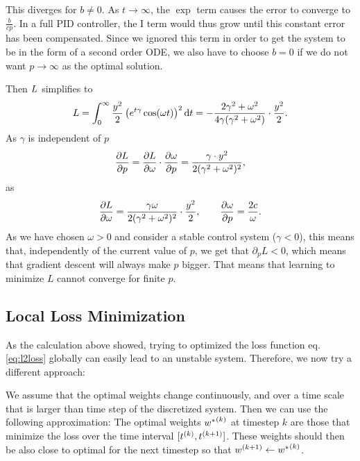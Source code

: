 \documentclass{article}
\begin{document}
    This diverges for $b \neq 0$. As $t \rightarrow \infty$, the $\exp$ term causes the error to converge to $\frac{b}{c p}$. 
    In a full PID controller, the I term would thus grow until this constant error has been compensated. 
    Since we ignored this term in order to get the system to be in the form of a second order ODE, 
    we also have to choose $b=0$ if we do not want $p \rightarrow \infty$ as the optimal solution.

    Then $L$ simplifies to
    \begin{align}
        L = \int_0^{\infty} \frac{y^2}{2}\left(e^{t\gamma} \cos (\omega t ) \right)^2 \mathrm{d}t = -\frac{2 \gamma^2 + \omega^2}{4 \gamma (\gamma^2 + \omega^2)} \cdot \frac{y^2}{2}.
    \end{align}
   As $\gamma$ is independent of $p$
    \begin{align}
        \frac{\partial L}{\partial p} = \frac{\partial L}{\partial \omega} \cdot \frac{\partial \omega}{\partial p} = \frac{\gamma \cdot y^2}{2 (\gamma^2 + \omega^2)^2},
    \end{align}
    as 
    \begin{align}
         \frac{\partial L}{\partial \omega} = \frac{\gamma \omega}{2 (\gamma^2 + \omega^2)^2} \cdot \frac{y^2}{2}, \qquad
         \frac{\partial \omega}{\partial p} = \frac{2 c}{\omega}.
    \end{align}
    As we have chosen $\omega >0$ and consider a stable control system ($\gamma < 0$), this means that, 
    independently of the current value of $p$, we get that $\partial_p L < 0$, 
    which means that gradient descent will always make $p$ bigger. 
    That means that learning to minimize $L$ cannot converge for finite $p$.

  \subsection{Local Loss Minimization}
    As the calculation above showed, trying to optimized the loss function eq. \eqref{eq:l2loss} globally can easily
    lead to an unstable system. Therefore, we now try a different approach:

    We assume that the optimal weights change continuously, and over a time scale that is 
    larger than time step of the discretized system. Then we can use the following approximation: The optimal weights 
    ${w^*}^{(k)}$ at timestep $k$ are those that minimize the loss over the time interval $[{t}^{(k)}, {t}^{(k+1)}]$. 
    These weights should then be also close to optimal for the next timestep so that 
    ${w}^{(k+1)} \leftarrow {w^*}^{(k)}$.
\end{document}
